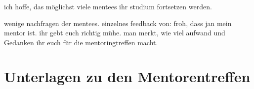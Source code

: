 \documentclass[
    paper=a4,
    div=calc,
    numbers=noendperiod,
    twocolumn,
]{scrartcl}
\begin{document}
    ich hoffe, das möglichst viele mentees ihr studium fortsetzen werden.

    wenige nachfragen der mentees. einzelnes feedback von: froh, dass jan mein mentor ist. ihr gebt euch richtig mühe. man merkt, wie viel aufwand und Gedanken ihr euch für die mentoringtreffen macht.

\appendix

\clearpage
\newpage

\section{Unterlagen zu den Mentorentreffen}
    \label{sec:appendix}
    
    

    
\end{document}
